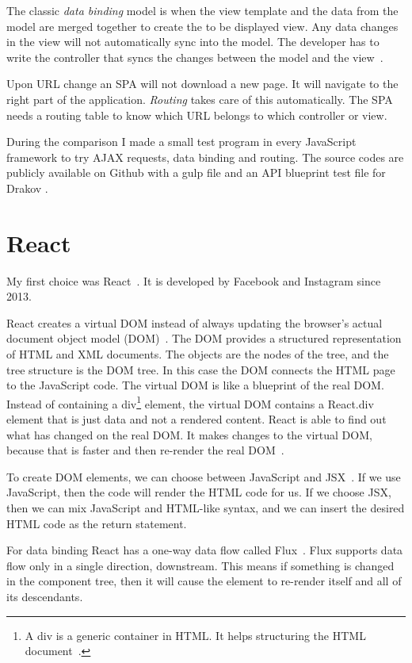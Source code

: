 The classic \emph{data binding} model is when the view template and the data from the model are merged together to create the to be displayed view. Any data changes in the view will not automatically sync into the model. The developer has to write the controller that syncs the changes between the model and the view~\cite{Angular-Developer-DataBinding}.

Upon URL change an SPA will not download a new page. It will navigate to the right part of the application. \emph{Routing} takes care of this automatically. The SPA needs a routing table to know which URL belongs to which controller or view.

During the comparison I made a small test program in every JavaScript framework to try AJAX requests, data binding and routing. The source codes are publicly available on Github with a gulp file  and an API blueprint test file for Drakov .

\section{React}

My first choice was React~\cite{React}. It is developed by Facebook and Instagram since 2013.

React creates a virtual DOM instead of always updating the browser's actual document object model (DOM)~\cite{dom}. The DOM provides a structured representation of HTML and XML documents. The objects are the nodes of the tree, and the tree structure is the DOM tree. In this case the DOM connects the HTML page to the JavaScript code. The virtual DOM is like a blueprint of the real DOM. Instead of containing a div\footnote{A div is a generic container in HTML. It helps structuring the HTML document~\cite{div}.} element, the virtual DOM contains a React.div element that is just data and not a rendered content. React is able to find out what has changed on the real DOM. It makes changes to the virtual DOM, because that is faster and then re-render the real DOM~\cite{React-Virtual-DOM}.

To create DOM elements, we can choose between JavaScript and JSX~\cite{JSX}. If we use JavaScript, then the code will render the HTML code for us. If we choose JSX, then we can mix JavaScript and HTML-like syntax, and we can insert the desired HTML code as the return statement. 

For data binding React has a one-way data flow called Flux~\cite{Flux}. Flux supports data flow only in a single direction, downstream. This means if something is changed in the component tree, then it will cause the element to re-render itself and all of its descendants.

